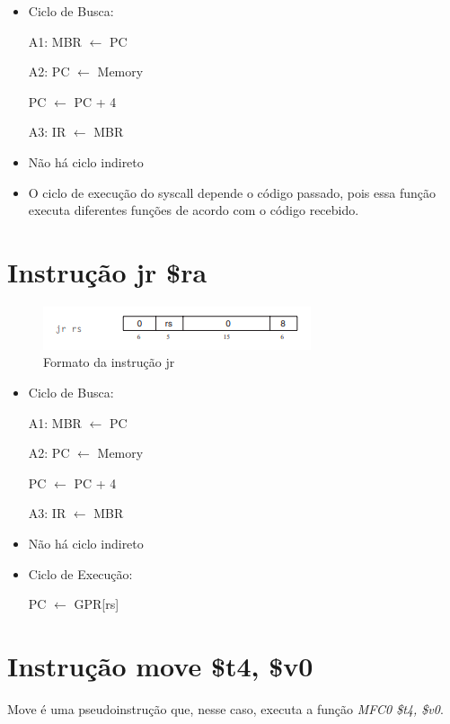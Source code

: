 \documentclass[
	12pt,				%
	oneside,			%
	a4paper,			%
	english,			%
	brazil				%
	]{abntex2ppgsi}
\begin{document}
\begin{itemize}
    \item Ciclo de Busca:

    A1: MBR $\leftarrow$ PC

    A2: PC $\leftarrow$ Memory

    PC $\leftarrow$ PC + 4

    A3: IR $\leftarrow$ MBR

    \item Não há ciclo indireto
    \item O ciclo de execução do syscall depende o código passado, pois essa função executa diferentes funções de acordo com o código recebido. 
    
\end{itemize}

\section{Instrução jr \$ra}

\begin{figure}[h]
    \centering
    \includegraphics{4_14.png}
    \caption{Formato da instrução jr}
    \label{fig4_14}
\end{figure}

\begin{itemize}
    \item Ciclo de Busca:

    A1: MBR $\leftarrow$ PC

    A2: PC $\leftarrow$ Memory

    PC $\leftarrow$ PC + 4

    A3: IR $\leftarrow$ MBR

    \item Não há ciclo indireto
    \item Ciclo de Execução:
    
    PC $\leftarrow$ GPR[rs]
\end{itemize}

\section{Instrução move \$t4, \$v0}

Move é uma pseudoinstrução que, nesse caso, executa a função \textit{MFC0 \$t4, \$v0}.
\end{document}
